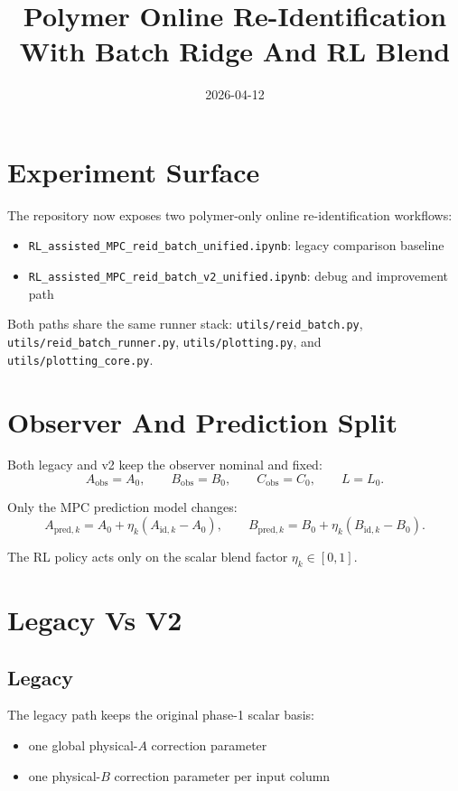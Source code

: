 \documentclass[11pt]{article}
\title{Polymer Online Re-Identification With Batch Ridge And RL Blend}
\date{2026-04-12}
\begin{document}
\maketitle

\section*{Experiment Surface}

The repository now exposes two polymer-only online re-identification
workflows:

\begin{itemize}
\item \texttt{RL\_assisted\_MPC\_reid\_batch\_unified.ipynb}: legacy comparison
      baseline
\item \texttt{RL\_assisted\_MPC\_reid\_batch\_v2\_unified.ipynb}: debug and
      improvement path
\end{itemize}

Both paths share the same runner stack:
\texttt{utils/reid\_batch.py},
\texttt{utils/reid\_batch\_runner.py},
\texttt{utils/plotting.py}, and
\texttt{utils/plotting\_core.py}.

\section*{Observer And Prediction Split}

Both legacy and v2 keep the observer nominal and fixed:
\[
A_{\mathrm{obs}} = A_0,\qquad
B_{\mathrm{obs}} = B_0,\qquad
C_{\mathrm{obs}} = C_0,\qquad
L = L_0.
\]

Only the MPC prediction model changes:
\[
A_{\mathrm{pred},k} = A_0 + \eta_k (A_{\mathrm{id},k} - A_0), \qquad
B_{\mathrm{pred},k} = B_0 + \eta_k (B_{\mathrm{id},k} - B_0).
\]

The RL policy acts only on the scalar blend factor $\eta_k \in [0,1]$.

\section*{Legacy Vs V2}

\subsection*{Legacy}

The legacy path keeps the original phase-1 scalar basis:

\begin{itemize}
\item one global physical-$A$ correction parameter
\item one physical-$B$ correction parameter per input column
\end{itemize}
\end{document}
